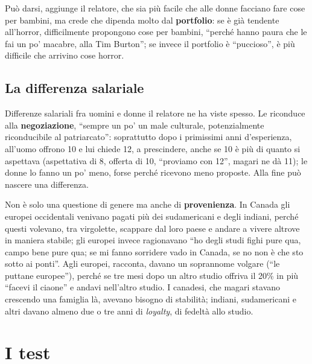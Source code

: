 Può darsi, aggiunge il relatore, che sia più facile che alle donne facciano
fare cose per bambini, ma crede che dipenda molto dal \textbf{portfolio}: se è
già tendente all'horror, difficilmente propongono cose per bambini, ``perché
hanno paura che le fai un po' macabre, alla Tim Burton''; se invece il
portfolio è ``puccioso'', è più difficile che arrivino cose horror.

\subsection{La differenza salariale}

Differenze salariali fra uomini e donne il relatore ne ha viste spesso. Le
riconduce alla \textbf{negoziazione}, ``sempre un po' un male culturale,
potenzialmente riconducibile al patriarcato'': soprattutto dopo i primissimi
anni d'esperienza, all'uomo offrono 10 e lui chiede 12, a prescindere, anche
se 10 è più di quanto si aspettava (aspettativa di 8, offerta di 10, ``proviamo
con 12'', magari ne dà 11); le donne lo fanno un po' meno, forse perché
ricevono meno proposte. Alla fine può nascere una differenza.

Non è solo una questione di genere ma anche di \textbf{provenienza}. In
Canada gli europei occidentali venivano pagati più dei sudamericani e degli
indiani, perché questi volevano, tra virgolette, scappare dal loro paese e
andare a vivere altrove in maniera stabile; gli europei invece ragionavano
``ho degli studi fighi pure qua, campo bene pure qua; se mi fanno sorridere
vado in Canada, se no non è che sto sotto ai ponti''. Agli europei, racconta,
davano un soprannome volgare (``le puttane europee''), perché se tre mesi
dopo un altro studio offriva il 20\% in più ``facevi il ciaone'' e andavi
nell'altro studio. I canadesi, che magari stavano crescendo una famiglia là,
avevano bisogno di stabilità; indiani, sudamericani e altri davano almeno due
o tre anni di \emph{loyalty}, di fedeltà allo studio.

\section{I test}
\label{p4:sec:test}

